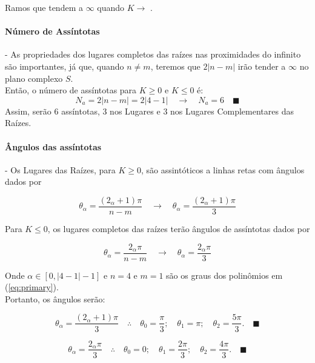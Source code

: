 \documentclass[a4paper, 12pt]{article}
\begin{document}
Ramos que tendem a $\infty$ quando $K \longrightarrow$ \infty.

\paragraph{Número de Assíntotas} - 
As propriedades dos lugares completos das raízes nas proximidades do infinito são importantes, já que, quando $n \neq m$, teremos que $2|n-m|$ irão tender a $\infty$ no plano complexo $S$. \\

Então, o número de assíntotas para $K \geq 0$ e $K \leq 0$ é:
\begin{equation}
    N_{a}=2|n-m| = 2|4-1| \quad \longrightarrow \quad N_{a} = 6 \quad \blacksquare
\end{equation} 
Assim, serão 6 assíntotas, 3 nos Lugares e 3 nos Lugares Complementares das Raízes.

\paragraph{Ângulos das assíntotas} - 
Os Lugares das Raízes, para $K \geq 0$, são assintóticos a linhas retas com ângulos dados por 

\begin{equation}
    \theta_{\alpha} = \frac{(2_{\alpha}+1)\pi}{n-m} \quad \longrightarrow \quad \theta_{\alpha} = \frac{(2_{\alpha}+1)\pi}{3}  
\end{equation}

Para $K \leq 0$, os lugares completos das raízes terão ângulos de assíntotas dados por

\begin{equation}
    \theta_{\alpha} = \frac{2_{\alpha}\pi}{n-m} \quad \longrightarrow \quad \theta_{\alpha} = \frac{2_{\alpha}\pi}{3}  
\end{equation}

Onde $\alpha \in [0, |4-1| - 1]$ e $n = 4$ e $m = 1$ são os graus dos polinômios em (\ref{eq:primary}).\\

Portanto, os ângulos serão:

\begin{equation}
	\theta_{\alpha} = \frac{(2_{\alpha}+1)\pi}{3}  \quad \therefore \quad \theta_{0}=\frac{\pi}{3}; \quad \theta_{1}=\pi; \quad \theta_{2}=\frac{5 \pi}{3} . \quad \blacksquare
\end{equation}


\begin{equation}
	\theta_{\alpha} = \frac{2_{\alpha}\pi}{3} \quad \therefore \quad \theta_{0} = 0; \quad \theta_{1}=\frac{2 \pi}{3}; \quad \theta_{2} = \frac{4 \pi}{3} . \quad \blacksquare
\end{equation}
\end{document}
